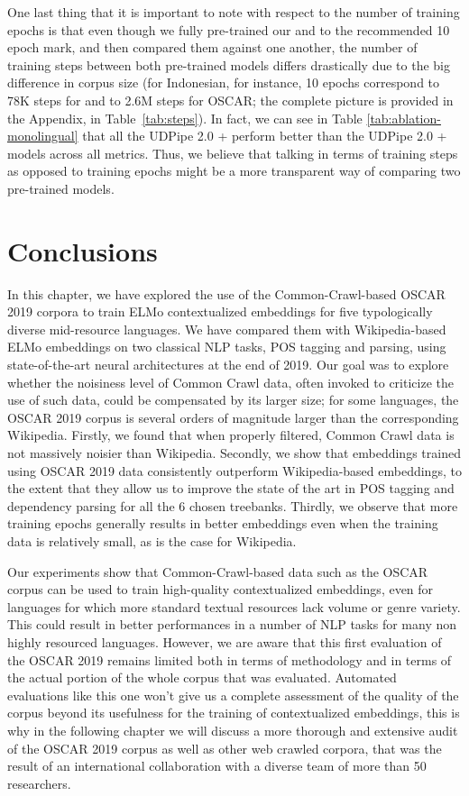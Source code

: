 One last thing that it is important to note with respect to the number of training epochs is that even though we fully pre-trained our \elmowikis and \elmooscars to the recommended 10 epoch mark, and then compared them against one another, the number of training steps between both pre-trained models differs drastically due to the big difference in corpus size (for Indonesian, for instance, 10 epochs correspond to 78K steps for \elmowiki and to 2.6M steps for OSCAR; the complete picture is provided in the Appendix, in Table~\ref{tab:steps}). In fact, we can see in Table \ref{tab:ablation-monolingual} that all the UDPipe 2.0 + \elmooscarone perform better than the UDPipe 2.0 + \elmowikione models across all metrics. Thus, we believe that talking in terms of training steps as opposed to training epochs might be a more transparent way of comparing two pre-trained models.

\section{Conclusions}

In this chapter, we have explored the use of the Common-Crawl-based OSCAR 2019 corpora to train ELMo contextualized embeddings for five typologically diverse mid-resource languages. We have compared them with Wikipedia-based ELMo embeddings on two classical NLP tasks, POS tagging and parsing, using state-of-the-art neural architectures at the end of 2019. Our goal was to explore whether the noisiness level of Common Crawl data, often invoked to criticize the use of such data, could be compensated by its larger size; for some languages, the OSCAR 2019 corpus is several orders of magnitude larger than the corresponding Wikipedia. Firstly, we found that when properly filtered, Common Crawl data is not massively noisier than Wikipedia. Secondly, we show that embeddings trained using OSCAR 2019 data consistently outperform Wikipedia-based embeddings, to the extent that they allow us to improve the state of the art in POS tagging and dependency parsing for all the 6 chosen treebanks. Thirdly, we observe that more training epochs generally results in better embeddings even when the training data is relatively small, as is the case for Wikipedia.

Our experiments show that Common-Crawl-based data such as the OSCAR corpus can be used to train high-quality contextualized embeddings, even for languages for which more standard textual resources lack volume or genre variety. This could result in better performances in a number of NLP tasks for many non highly resourced languages. However, we are aware that this first evaluation of the OSCAR 2019 remains limited both in terms of methodology and in terms of the actual portion of the whole corpus that was evaluated. Automated evaluations like this one won't give us a complete assessment of the quality of the corpus beyond its usefulness for the training of contextualized embeddings, this is why in the following chapter we will discuss a more thorough and extensive audit of the OSCAR 2019 corpus as well as other web crawled corpora, that was the result of an international collaboration with a diverse team of more than 50 researchers.
